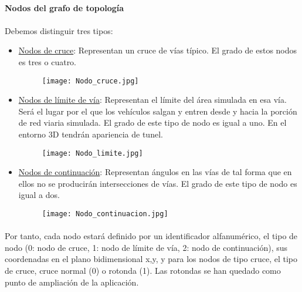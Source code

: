 	\paragraph{Nodos del grafo de topología}
	
	\paragraph{}
	Debemos distinguir tres tipos:
	\begin{itemize}
		\item \underline{Nodos de cruce}: Representan un cruce de vías típico. El grado de estos nodos es tres o cuatro.
		
		\begin{figure}[H]
			\centering
				\texttt{[image: Nodo\_cruce.jpg]}
		\end{figure}
	
		\item \underline{Nodos de límite de vía}: Representan el límite del área simulada en esa vía. Será el lugar por el que los vehículos salgan y entren desde y hacia la porción de red viaria simulada. El grado de este tipo de nodo es igual a uno. En el entorno 3D tendrán apariencia de tunel.
		
		\begin{figure}[H]
			\centering
				\texttt{[image: Nodo\_limite.jpg]}
		\end{figure}
	
		\item \underline{Nodos de continuación}: Representan ángulos en las vías de tal forma que en ellos no se producirán intersecciones de vías. El grado de este tipo de nodo es igual a dos.
		
		\begin{figure}[H]
			\centering
				\texttt{[image: Nodo\_continuacion.jpg]}
		\end{figure}
	
	\end{itemize}
	
	\paragraph{}
	Por tanto, cada nodo estará definido por un identificador alfanumérico, el tipo de nodo (0: nodo de cruce, 1: nodo de límite de vía, 2: nodo de continuación), sus coordenadas en el plano bidimensional x,y, y para los nodos de tipo cruce, el tipo de cruce, cruce normal (0) o rotonda (1). Las rotondas se han quedado como punto de ampliación de la aplicación.
	
